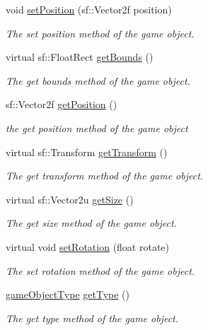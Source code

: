 \begin{DoxyCompactItemize}
void \hyperlink{class_game_object_a0f411667e5177a08ba7fdb3487bfbb13}{set\+Position} (sf\+::\+Vector2f position)
\begin{DoxyCompactList}\small\item\em The set position method of the game object. \end{DoxyCompactList}\item 
virtual sf\+::\+Float\+Rect \hyperlink{class_game_object_ab82f4f320038769dc98a972340c15fc6}{get\+Bounds} ()
\begin{DoxyCompactList}\small\item\em The get bounds method of the game object. \end{DoxyCompactList}\item 
sf\+::\+Vector2f \hyperlink{class_game_object_ae682851d1b2d40a793465c959eafafa4}{get\+Position} ()
\begin{DoxyCompactList}\small\item\em the get position method of the game object \end{DoxyCompactList}\item 
virtual sf\+::\+Transform \hyperlink{class_game_object_a099849f3c0c6cfb0e0957d7fb6b37809}{get\+Transform} ()
\begin{DoxyCompactList}\small\item\em The get transform method of the game object. \end{DoxyCompactList}\item 
virtual sf\+::\+Vector2u \hyperlink{class_game_object_a2f771b23fa5f6c2e031b308fa3926ada}{get\+Size} ()
\begin{DoxyCompactList}\small\item\em The get size method of the game object. \end{DoxyCompactList}\item 
virtual void \hyperlink{class_game_object_a32562ecd2f833271b606d86a926d82b8}{set\+Rotation} (float rotate)
\begin{DoxyCompactList}\small\item\em The set rotation method of the game object. \end{DoxyCompactList}\item 
\hyperlink{class_game_object_ad5092169e581fb0772e01026882ea0c8}{game\+Object\+Type} \hyperlink{class_game_object_ade4b28552dd1f507a2b92b9b6c55ce65}{get\+Type} ()
\begin{DoxyCompactList}\small\item\em The get type method of the game object. \end{DoxyCompactList}\item 

\end{DoxyCompactItemize}
